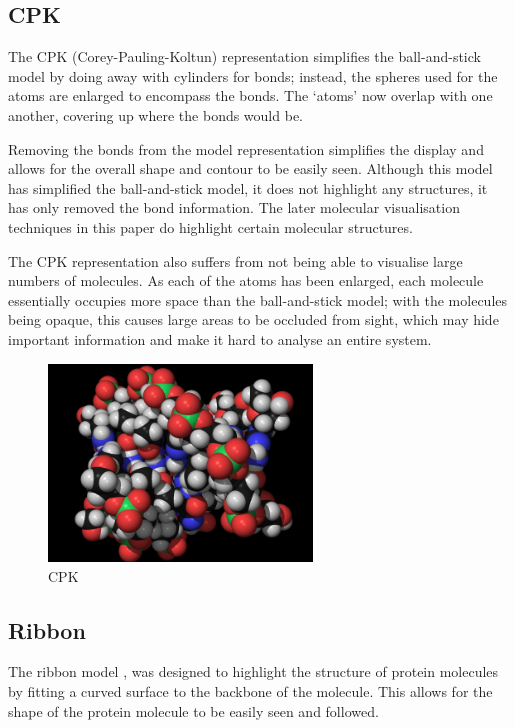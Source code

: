 \documentclass[a4paper]{article}
\begin{document}
\subsection*{CPK}
The CPK (Corey-Pauling-Koltun) \citep{corey53} representation simplifies the
ball-and-stick model by doing away with cylinders for bonds; instead, the
spheres used for the atoms are enlarged to encompass the bonds. The `atoms' now
overlap with one another, covering up where the bonds would be.

Removing the bonds from the model representation simplifies the display and
allows for the overall shape and contour to be easily seen. Although this model
has simplified the ball-and-stick model, it does not highlight any structures,
it has only removed the bond information. The later molecular visualisation
techniques in this paper do highlight certain molecular structures.

The CPK representation also suffers from not being able to visualise large
numbers of molecules. As each of the atoms has been enlarged, each molecule
essentially occupies more space than the ball-and-stick model; with the
molecules being opaque, this causes large areas to be occluded from sight, which
may hide important information and make it hard to analyse an entire system.

\begin{figure}[h!]
  \begin{center}
    \includegraphics[width=70mm]{CPK-big}
  \end{center}
  \caption{CPK}
  \label{fig:cpkbig}
\end{figure}

\subsection*{Ribbon}
The ribbon model \citep{richardson81}, \citep{carson87} was designed to
highlight the structure of protein molecules by fitting a curved surface to the
backbone of the molecule. This allows for the shape of the protein molecule to
be easily seen and followed.
\end{document}
